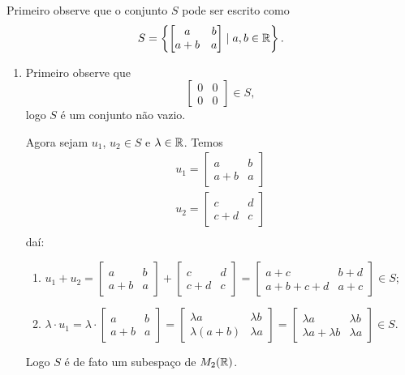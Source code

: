 \documentclass[12pt]{exam}
\begin{document}
    \solucao Primeiro observe que o conjunto $S$ pode ser escrito como
    \[
        S = \left\{\begin{bmatrix}
            a & b\\a + b & a
        \end{bmatrix} \mid a, b \in \mathbb{R}\right\}.
    \]
    \begin{enumerate}[label={\alph*})]
        \item Primeiro observe que
        \[
            \begin{bmatrix}
                0 & 0\\ 0 & 0
            \end{bmatrix} \in S,
        \]
        logo $S$ é um conjunto não vazio.

        Agora sejam $u_1$, $u_2 \in S$ e $\lambda \in \mathbb{R}$. Temos
        \begin{align*}
            u_1 = \begin{bmatrix}a & b\\a + b & a\end{bmatrix}\\
            u_2 = \begin{bmatrix}c & d\\c + d & c\end{bmatrix}\\
        \end{align*}
        daí:
        \begin{enumerate}[label={\roman*})]
            \item $u_1 + u_2 = \begin{bmatrix}a & b\\a + b & a\end{bmatrix} + \begin{bmatrix}c & d\\c + d & c\end{bmatrix} = \begin{bmatrix}a + c & b + d\\a + b + c + d & a + c\end{bmatrix}\in S$;
            \item $\lambda\cdot u_1 = \lambda\cdot \begin{bmatrix}a & b\\a + b & a\end{bmatrix} = \begin{bmatrix}\lambda a & \lambda b\\\lambda(a + b) & \lambda a\end{bmatrix} = \begin{bmatrix}\lambda a & \lambda b\\\lambda a + \lambda b & \lambda a\end{bmatrix} \in S$.
        \end{enumerate}
        Logo $S$ é de fato um subespaço de $M_2(\mathbb{R})$.


\end{enumerate}
\end{document}
